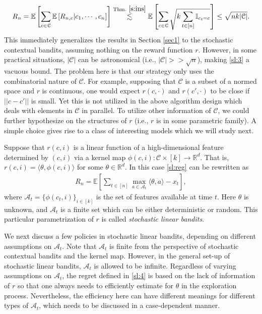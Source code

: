 \documentclass[10pt,a4paper]{amsart}
\numberwithin{equation}{section}
\theoremstyle{plain}
\theoremstyle{definition}
\def\R{{\mathbb R}}
\def\E{{\mathbb E}}
\def\R{{\mathbb R}}
\def\t{{\theta}}
\begin{document}
\begin{align}
R_n=\E\left[\sum_{c\in\mathcal C}\E\left[R_{n,c}|c_1, \cdots, c_n\right]\right]\stackrel{\text{Thm.}\ \ref{s:ins}}{\lesssim}\E\left[\sum_{c\in\mathcal C}\sqrt{k\sum_{t\in [n]}\mathbb I_{c_t = c}}\right]\leq\sqrt{nk|\mathcal C|}.\label{sl:3}
\end{align} 
This immediately generalizes the results in Section \ref{sec1} to the stochastic contextual bandits, assuming nothing on the reward function $r$. However, in some practical situations, $|\mathcal C|$ can be astronomical (i.e., $|\mathcal C|>>\sqrt{n}$), making \eqref{sl:3} a vacuous bound.  The problem here is that our strategy only uses the combinatorial nature of $\mathcal C$. For example, supposing that $\mathcal C$ is a subset of a normed space and $r$ is continuous, one would expect $r(c, \cdot)$ and $r(c', \cdot)$ to be close if $||c-c'||$ is small. Yet this is not utilized in the above algorithm design which deals with elements in $\mathcal C$ in parallel. To utilize other information of $\mathcal C$, we could further hypothesize on the structures of $r$ (i.e., $r$ is in some parametric family). A simple choice gives rise to a class of interesting models which we will study next. 

Suppose that $r(c,i)$ is a linear function of a high-dimensional feature determined by $(c, i)$ via a kernel map $\phi(c,i): \mathcal C\times [k]\to\R^d$. That is, $r(c, i) = \langle\t, \phi(c,i) \rangle$ for some $\t\in\R^d$. In this case \eqref{sl:reg} can be rewritten as 
\begin{align}
R_n = \E\left[\sum_{t\in [n]}\max_{a\in\mathcal A_t}\langle\theta, a\rangle-x_{t}\right],\label{sl:4}
\end{align}  
where $\mathcal A_t = \{\phi(c_t, i)\}_{i\in [k]}$ is the set of features available at time $t$. Here $\theta$ is unknown, and $\mathcal A_t$ is a finite set which can be either deterministic or random. This particular parametrization of $r$ is called \emph{stochastic linear bandits}. 

We next discuss a few policies in stochastic linear bandits, depending on different assumptions on $\mathcal A_t$. Note that $\mathcal A_t$ is finite from the perspective of stochastic contextual bandits and the kernel map. However, in the general set-up of stochastic linear bandits, $\mathcal A_t$ is allowed to be infinite. Regardless of varying assumptions on $\mathcal A_t$, the regret defined in \eqref{sl:4} is based on the lack of information of $r$ so that one always needs to efficiently estimate for $\theta$ in the exploration process. Nevertheless, the efficiency here can have different meanings for different types of $\mathcal A_t$, which needs to be discussed in a case-dependent manner. 
\end{document}
